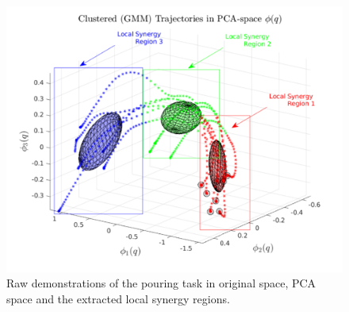 \documentclass{article}
\begin{document}
\begin{enumerate}
\begin{figure}[!th]
\begin{minipage}{0.47\textwidth}
		\includegraphics[trim={0.8cm 0.5cm 0cm 0.35cm},clip,width=\linewidth]{../../src/JTDS_mat_lib/figures/local_synergy_regions_pour_annotated.pdf}
   \end{minipage}
   \caption{Raw demonstrations of the pouring task in original space, PCA space and the extracted local synergy regions. \label{fig:raw_demos}}
\end{figure}


\end{enumerate}
\end{document}
